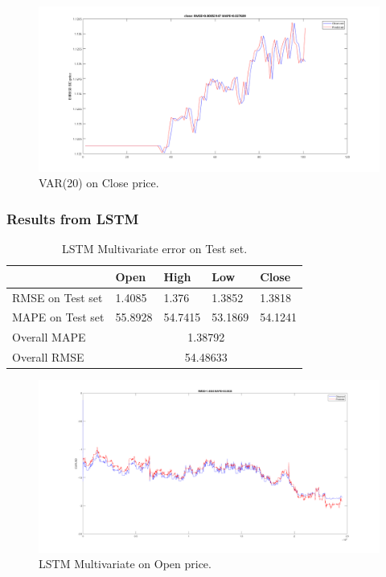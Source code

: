 \documentclass[11pt]{article}
\begin{document}
\begin{figure}[H]
  \centering
  \includegraphics[width=\linewidth,keepaspectratio]{figs/var20close100.png}
  \caption{VAR(20) on Close price.}
\end{figure}

\subsubsection{Results from LSTM}

\begin{table}[H]
  \centering
\begin{tabular}{|l|l|l|l|l|}
  \hline
                   & Open        & High       & Low        & Close      \\ \hline
  RMSE on Test set & 1.4085      & 1.376      & 1.3852     & 1.3818     \\ \hline
  MAPE on Test set & 55.8928     & 54.7415    & 53.1869    & 54.1241    \\ \hline
  Overall MAPE     & \multicolumn{4}{c|}{1.38792}         \\ \hline
  Overall RMSE     & \multicolumn{4}{c|}{54.48633}        \\ \hline
\end{tabular}
\caption{LSTM Multivariate error on Test set.}
\end{table}


\begin{figure}[H]
  \centering
  \includegraphics[width=\textwidth,keepaspectratio]{figs/lstm_multi_open.png}
  \caption{LSTM Multivariate on Open price.}
\end{figure}
\end{document}
